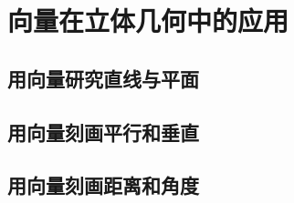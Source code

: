 \section{向量在立体几何中的应用}

\subsection{用向量研究直线与平面}


\clearpage
\subsection{用向量刻画平行和垂直}
\clearpage
\subsection{用向量刻画距离和角度}
\clearpage
